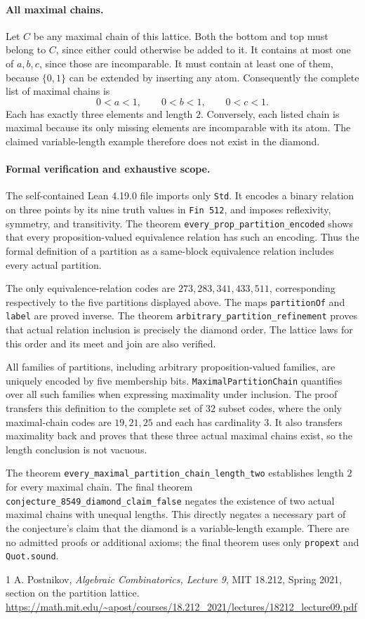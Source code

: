 \documentclass[11pt]{article}
\begin{document}
\paragraph{All maximal chains.}
Let $C$ be any maximal chain of this lattice.  Both the bottom and
top must belong to $C$, since either could otherwise be added to it.
It contains at most one of $a,b,c$, since those are incomparable.
It must contain at least one of them, because $\{0,1\}$ can be
extended by inserting any atom.  Consequently the complete list of
maximal chains is
\[
0<a<1,\qquad 0<b<1,\qquad 0<c<1.
\]
Each has exactly three elements and length $2$.  Conversely, each
listed chain is maximal because its only missing elements are
incomparable with its atom.  The claimed variable-length example
therefore does not exist in the diamond.

\paragraph{Formal verification and exhaustive scope.}
The self-contained Lean 4.19.0 file imports only \texttt{Std}.
It encodes a binary relation on three points by its nine truth values
in \texttt{Fin 512}, and imposes reflexivity, symmetry, and transitivity.
The theorem \texttt{every\_prop\_partition\_encoded} shows that every
proposition-valued equivalence relation has such an encoding.
Thus the formal definition of a partition as a same-block equivalence
relation includes every actual partition.

The only equivalence-relation codes are
$273,283,341,433,511$, corresponding respectively to the five
partitions displayed above.  The maps \texttt{partitionOf} and
\texttt{label} are proved inverse.  The theorem
\texttt{arbitrary\_partition\_refinement} proves that actual relation
inclusion is precisely the diamond order.  The lattice laws for this
order and its meet and join are also verified.

All families of partitions, including arbitrary proposition-valued
families, are uniquely encoded by five membership bits.
\texttt{MaximalPartitionChain} quantifies over all such families when
expressing maximality under inclusion.  The proof transfers this
definition to the complete set of $32$ subset codes, where the only
maximal-chain codes are $19,21,25$ and each has cardinality $3$.
It also transfers maximality back and proves that these three actual
maximal chains exist, so the length conclusion is not vacuous.

The theorem \texttt{every\_maximal\_partition\_chain\_length\_two}
establishes length $2$ for every maximal chain.
The final theorem
\texttt{conjecture\_8549\_diamond\_claim\_false}
negates the existence of two actual maximal chains with unequal
lengths.  This directly negates a necessary part of the conjecture's
claim that the diamond is a variable-length example.
There are no admitted proofs or additional axioms; the final theorem
uses only \texttt{propext} and \texttt{Quot.sound}.

\begin{thebibliography}{1}
A. Postnikov, \emph{Algebraic Combinatorics, Lecture 9},
MIT 18.212, Spring 2021, section on the partition lattice.
\url{https://math.mit.edu/~apost/courses/18.212_2021/lectures/18212_lecture09.pdf}
\end{thebibliography}
\end{document}
